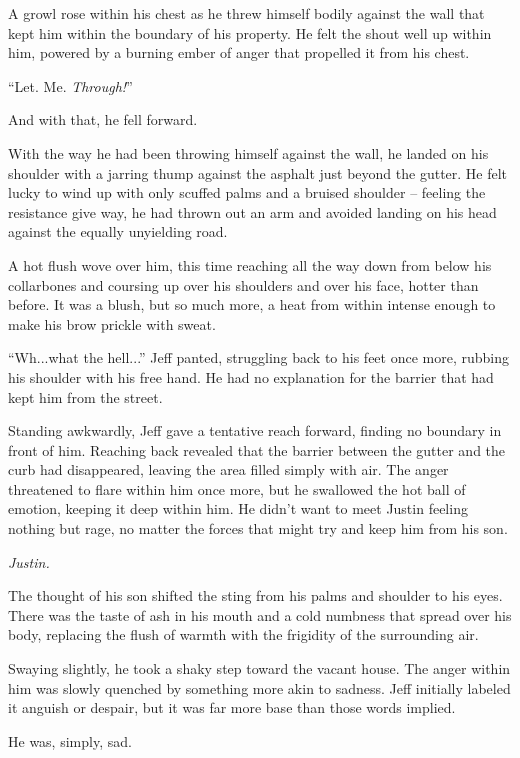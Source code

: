 A growl rose within his chest as he threw himself bodily against the wall that kept him within the boundary of his property.  He felt the shout well up within him, powered by a burning ember of anger that propelled it from his chest.

``Let.  Me.  \textit{Through!}''

And with that, he fell forward.

With the way he had been throwing himself against the wall, he landed on his shoulder with a jarring thump against the asphalt just beyond the gutter.  He felt lucky to wind up with only scuffed palms and a bruised shoulder -- feeling the resistance give way, he had thrown out an arm and avoided landing on his head against the equally unyielding road.

A hot flush wove over him, this time reaching all the way down from below his collarbones and coursing up over his shoulders and over his face, hotter than before.  It was a blush, but so much more, a heat from within intense enough to make his brow prickle with sweat.

\secdiv

``Wh...what the hell...'' Jeff panted, struggling back to his feet once more, rubbing his shoulder with his free hand.  He had no explanation for the barrier that had kept him from the street.

Standing awkwardly, Jeff gave a tentative reach forward, finding no boundary in front of him.  Reaching back revealed that the barrier between the gutter and the curb had disappeared, leaving the area filled simply with air.  The anger threatened to flare within him once more, but he swallowed the hot ball of emotion, keeping it deep within him.  He didn't want to meet Justin feeling nothing but rage, no matter the forces that might try and keep him from his son.

\textit{Justin.}

The thought of his son shifted the sting from his palms and shoulder to his eyes.  There was the taste of ash in his mouth and a cold numbness that spread over his body, replacing the flush of warmth with the frigidity of the surrounding air.

Swaying slightly, he took a shaky step toward the vacant house.  The anger within him was slowly quenched by something more akin to sadness.  Jeff initially labeled it anguish or despair, but it was far more base than those words implied.

He was, simply, sad.

